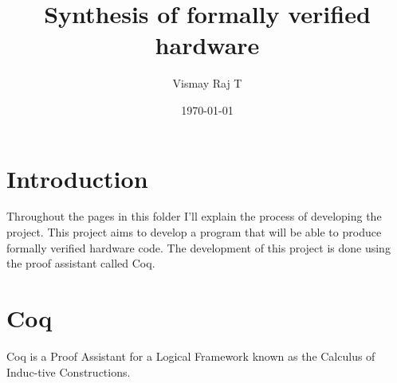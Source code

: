 \documentclass{article}
\begin{document}
\title{Synthesis of formally verified hardware}
\author{Vismay Raj T}
\date{\today}
\maketitle



\section{Introduction}
Throughout the pages in this folder I'll explain the process of developing the project.
This project aims to develop a program that will be able to produce formally verified hardware code.
The development of this project is done using the proof assistant called Coq.

\section{Coq}
Coq is a Proof Assistant for a Logical Framework known as the Calculus of Induc-tive Constructions.
\end{document}
